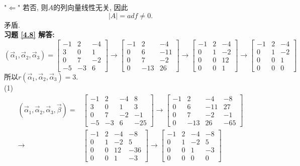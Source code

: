 "$\Leftarrow$" 若否, 则$A$的列向量线性无关, 因此$$|A|=adf\not=0.$$ 矛盾.\\
\textbf{习题 \ref{4.8} 解答:}\\
$$(\vec{\alpha}_1, \vec{\alpha}_2,\vec{\alpha}_3)=\begin{bmatrix}-1&2&-4\\ 3&0&1\\ 0&7&-2\\-5&-3&6\end{bmatrix}
\rightarrow \begin{bmatrix}-1&2&-4\\ 0&6&-11\\ 0&7&-2\\0&-13&26\end{bmatrix}
\rightarrow \begin{bmatrix}-1&2&-4\\ 0&1&-2\\ 0&0&12\\0&0&1\end{bmatrix}
\rightarrow \begin{bmatrix}-1&2&-4\\ 0&1&-2\\ 0&0&1\\0&0&0\end{bmatrix}$$
所以$r(\vec{\alpha}_1,\vec{\alpha}_2,\vec{\alpha}_3)=3$.\\
(1)\begin{displaymath}\begin{aligned}(\vec{\alpha}_1, \vec{\alpha}_2,\vec{\alpha}_3,\vec{\beta})=&\begin{bmatrix}-1&2&-4&8\\ 3&0&1&3\\ 0&7&-2&-1\\-5&-3&6&-25\end{bmatrix}
\rightarrow \begin{bmatrix}-1&2&-4&-8\\ 0&6&-11&27\\ 0&7&-2&-1\\0&-13&26&-65\end{bmatrix}\\
\rightarrow &\begin{bmatrix}-1&2&-4&-8\\ 0&1&-2&5\\ 0&0&12&-36\\0&0&1&-3\end{bmatrix}
\rightarrow \begin{bmatrix}-1&2&-4&-8\\ 0&1&-2&5\\ 0&0&1&-3\\0&0&0&0\end{bmatrix}\end{aligned}\end{displaymath}
